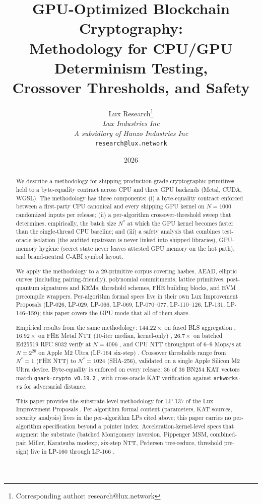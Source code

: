 \documentclass[11pt,a4paper]{article}
\title{GPU-Optimized Blockchain Cryptography:\\Methodology for CPU/GPU Determinism Testing,\\Crossover Thresholds, and Safety}
\author{
Lux Research\thanks{Corresponding author: research@lux.network}\\
\textit{Lux Industries Inc}\\
\textit{A subsidiary of Hanzo Industries Inc}\\
\texttt{research@lux.network}
}
\date{2026}
\begin{document}
\luxcoverpage

\begin{abstract}
We describe a methodology for shipping production-grade cryptographic primitives held to a byte-equality contract across CPU and three GPU backends (Metal, CUDA, WGSL). The methodology has three components: (i) a byte-equality contract enforced between a first-party CPU canonical and every shipping GPU kernel on $N{=}1000$ randomized inputs per release; (ii) a per-algorithm crossover-threshold sweep that determines, empirically, the batch size $N^{*}$ at which the GPU kernel becomes faster than the single-thread CPU baseline; and (iii) a safety analysis that combines test-oracle isolation (the audited upstream is never linked into shipped libraries), GPU-memory hygiene (secret state never leaves attested GPU memory on the hot path), and brand-neutral C-ABI symbol layout.

We apply the methodology to a 29-primitive corpus covering hashes, AEAD, elliptic curves (including pairing-friendly), polynomial commitments, lattice primitives, post-quantum signatures and KEMs, threshold schemes, FHE building blocks, and EVM precompile wrappers. Per-algorithm formal specs live in their own Lux Improvement Proposals (LP-026, LP-029, LP-066, LP-069, LP-070--077, LP-110--126, LP-131, LP-146--159); this paper covers the GPU mode that all of them share.

Empirical results from the same methodology: $144.22\times$ on fused BLS aggregation \cite{lp137benchmarks}, $16.92\times$ on FHE Metal NTT (10-iter median, kernel-only) \cite{lp137benchmarks}, $26.7\times$ on batched Ed25519 RFC 8032 verify at $N{=}4096$ \cite{lp137benchmarks}, and CPU NTT throughput of 6--9 Mops/s at $N=2^{20}$ on Apple M2 Ultra (LP-164 six-step) \cite{lp164}. Crossover thresholds range from $N^{*}{=}1$ (FHE NTT) to $N^{*}{=}1024$ (SHA-256), validated on a single Apple Silicon M2 Ultra device. Byte-equality is enforced on every release: 36 of 36 BN254 KAT vectors match \texttt{gnark-crypto v0.19.2} \cite{gnarkcrypto,lp146}, with cross-oracle KAT verification against \texttt{arkworks-rs} \cite{arkworks} for adversarial distance.

This paper provides the substrate-level methodology for LP-137 of the Lux Improvement Proposals \cite{lp137}. Per-algorithm formal content (parameters, KAT sources, security analysis) lives in the per-algorithm LPs cited above; this paper carries no per-algorithm specification beyond a pointer index. Acceleration-kernel-level specs that augment the substrate (batched Montgomery inversion, Pippenger MSM, combined-pair Miller, Karatsuba modexp, six-step NTT, Pedersen tree-reduce, threshold pre-sign) live in LP-160 through LP-166 \cite{lp160,lp161,lp162,lp163,lp164,lp165,lp166}.
\end{abstract}

\tableofcontents
\newpage












\end{document}
